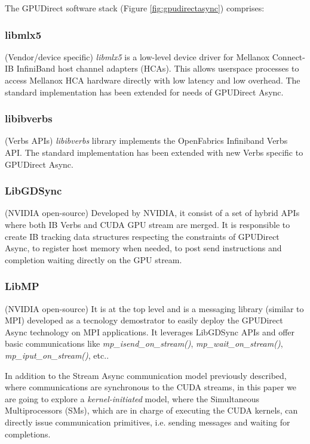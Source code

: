\documentclass[conference]{IEEEtran}
\begin{document}
The GPUDirect software stack (Figure \ref{fig:gpudirectasync}) comprises:

\subsubsection{libmlx5}(Vendor/device specific)
\emph{libmlx5} is a low-level device driver for Mellanox Connect-IB InfiniBand host channel adapters (HCAs). This allows userspace processes to access Mellanox HCA hardware directly with low latency and low overhead. The standard implementation has been extended for needs of GPUDirect Async.

\subsubsection{libibverbs}(Verbs APIs)
\emph{libibverbs} library implements the OpenFabrics Infiniband Verbs API. The standard implementation has been extended with new Verbs specific to GPUDirect Async.

\subsubsection{LibGDSync}(NVIDIA open-source)
Developed by NVIDIA, it consist of a set of hybrid APIs where both IB Verbs and CUDA GPU stream are merged. It is responsible to create IB tracking data structures respecting the constraints of GPUDirect Async, to register host memory when needed, to post send instructions and completion waiting directly on the GPU stream.
 
\subsubsection{LibMP}(NVIDIA open-source)
It is at the top level and is a messaging library (similar to MPI) developed as a tecnology demostrator to easily deploy the GPUDirect Async technology on MPI applications.
It leverages LibGDSync APIs and offer basic communications like \textit{mp\_isend\_on\_stream()}, \textit{mp\_wait\_on\_stream()}, \textit{mp\_iput\_on\_stream()}, etc.. 

In addition to the Stream Async communication model previously described,
where communications are synchronous to the CUDA streams, in this paper we are
going to explore a \textit{kernel-initiated} model, where the Simultaneous
Multiprocessors (SMs), which are in charge of executing the CUDA kernels,
can directly issue communication primitives, i.e. sending messages and
waiting for completions.
%
% 
\end{document}
